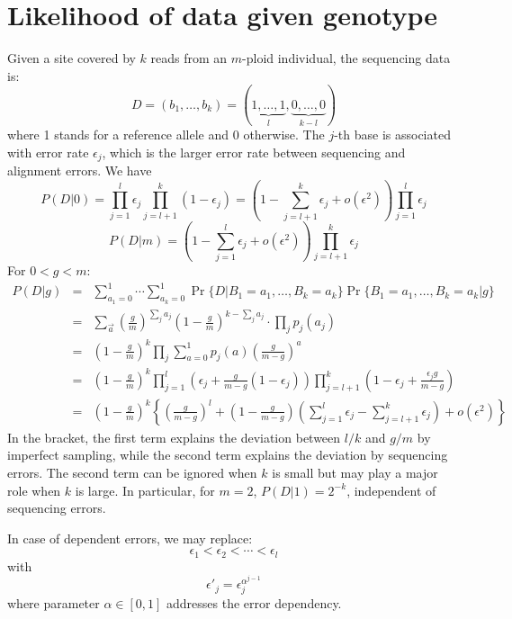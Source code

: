 \documentclass[pdftex,10pt]{book}
\begin{document}
\section{Likelihood of data given genotype}\label{sec:pdg}
Given a site covered by $k$ reads from an $m$-ploid individual, the
sequencing data is:
\[
D=(b_1,\dots,b_k)=(\underbrace{1,\ldots,1}_l,\underbrace{0,\ldots,0}_{k-l})
\]
where 1 stands for a reference allele and 0 otherwise. The $j$-th base
is associated with error rate $\epsilon_j$, which is the larger error
rate between sequencing and alignment errors. We have
\begin{equation}
P(D|0)=\prod_{j=1}^l\epsilon_j\prod_{j=l+1}^k(1-\epsilon_j)=\left(1-\sum_{j=l+1}^k\epsilon_j+o(\epsilon^2)\right)\prod_{j=1}^l\epsilon_j
\end{equation}
\begin{equation}
P(D|m)=\left(1-\sum_{j=1}^l\epsilon_j+o(\epsilon^2)\right)\prod_{j=l+1}^k\epsilon_j
\end{equation}
For $0<g<m$:
\begin{eqnarray}
P(D|g)&=&\sum_{a_1=0}^1\cdots\sum_{a_k=0}^1\Pr\{D|B_1=a_1,\ldots,B_k=a_k\}\Pr\{B_1=a_1,\ldots,B_k=a_k|g\}\\\nonumber
&=&\sum_{\vec{a}}\left(\frac{g}{m}\right)^{\sum_j a_j}\left(1-\frac{g}{m}\right)^{k-\sum_j a_j}\cdot\prod_j p_j(a_j)\\\nonumber
&=&\left(1-\frac{g}{m}\right)^k\prod_j\sum_{a=0}^1 p_j(a)\left(\frac{g}{m-g}\right)^a\\\nonumber
&=&\left(1-\frac{g}{m}\right)^k\prod_{j=1}^l\left(\epsilon_j+\frac{g}{m-g}(1-\epsilon_j)\right)\prod_{j=l+1}^k\left(1-\epsilon_j+\frac{\epsilon_jg}{m-g}\right)\\\nonumber
&=&\left(1-\frac{g}{m}\right)^k\left\{\left(\frac{g}{m-g}\right)^l+\left(1-\frac{g}{m-g}\right)\left(\sum_{j=1}^l\epsilon_j-\sum_{j=l+1}^k\epsilon_j\right)+o(\epsilon^2)\right\}
\end{eqnarray}
In the bracket, the first term explains the deviation between $l/k$ and
$g/m$ by imperfect sampling, while the second term explains the
deviation by sequencing errors. The second term can be ignored when $k$
is small but may play a major role when $k$ is large. In particular, for
$m=2$, $P(D|1)=2^{-k}$, independent of sequencing errors.

In case of dependent errors, we may replace:
\[\epsilon_1<\epsilon_2<\cdots<\epsilon_l\]
with
\[\epsilon'_j=\epsilon_j^{\alpha^{j-1}}\]
where parameter $\alpha\in[0,1]$ addresses the error dependency.
\end{document}
